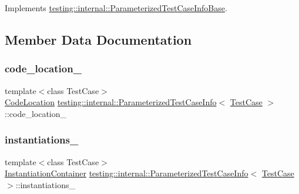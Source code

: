 Implements \mbox{\hyperlink{classtesting_1_1internal_1_1_parameterized_test_case_info_base_a92baca6c64c822c2e7043217f7903ef2}{testing\+::internal\+::\+Parameterized\+Test\+Case\+Info\+Base}}.



\subsection{Member Data Documentation}
\mbox{\label{classtesting_1_1internal_1_1_parameterized_test_case_info_a7eb114d9580001f9cb978684dfa8e0ee}} 
\subsubsection{\texorpdfstring{code\_location\_}{code\_location\_}}
{\footnotesize\ttfamily template$<$class Test\+Case$>$ \\
\mbox{\hyperlink{structtesting_1_1internal_1_1_code_location}{Code\+Location}} \mbox{\hyperlink{classtesting_1_1internal_1_1_parameterized_test_case_info}{testing\+::internal\+::\+Parameterized\+Test\+Case\+Info}}$<$ \mbox{\hyperlink{classtesting_1_1_test_case}{Test\+Case}} $>$\+::code\+\_\+location\+\_\+\hspace{0.3cm}{\ttfamily [private]}}

\mbox{\label{classtesting_1_1internal_1_1_parameterized_test_case_info_a2e86fd404a78daa1f1169bf689c4b3f4}} 
\subsubsection{\texorpdfstring{instantiations\_}{instantiations\_}}
{\footnotesize\ttfamily template$<$class Test\+Case$>$ \\
\mbox{\hyperlink{classtesting_1_1internal_1_1_parameterized_test_case_info_acf93d7726e6d55e312ac89c51379110c}{Instantiation\+Container}} \mbox{\hyperlink{classtesting_1_1internal_1_1_parameterized_test_case_info}{testing\+::internal\+::\+Parameterized\+Test\+Case\+Info}}$<$ \mbox{\hyperlink{classtesting_1_1_test_case}{Test\+Case}} $>$\+::instantiations\+\_\+\hspace{0.3cm}{\ttfamily [private]}}

